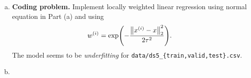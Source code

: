 \documentclass[12pt,letterpaper,boxed]{hmcpset}
\newcommand{\xx}{x^{(i)}}
\newcommand{\ww}{w^{(i)}}
\begin{document}
\begin{solution}
\begin{enumerate}[(a)]
  \item \textbf{Coding problem.} Implement locally weighted linear regression using normal equation in Part (a) and using
  \[
  \ww = \exp(- \frac{\norm{\xx - x}_2^2}{2 \tau^2}).
  \]
  The model seems to be \emph{underfitting} for \verb|data/ds5_{train,valid,test}.csv|.

  \item 
\end{enumerate}
\end{solution}
\end{document}
